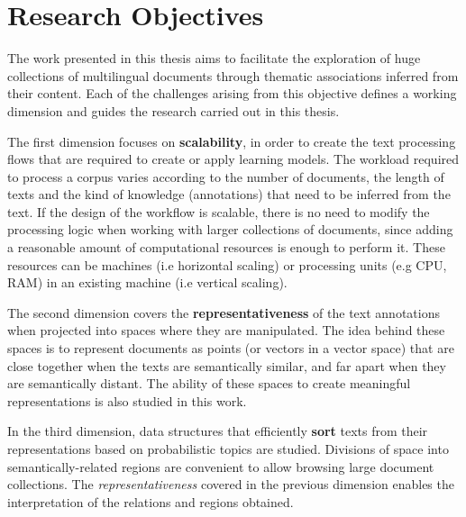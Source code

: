 

\chapter{Research Objectives}\label{ch:hypothesis}

\graphicspath{{hypothesis/figures/}}


The work presented in this thesis aims to facilitate the exploration of huge collections of multilingual documents through thematic associations inferred from their content. Each of the challenges arising from this objective defines a working dimension and guides the research carried out in this thesis.

The first dimension focuses on \textbf{scalability}, in order to create the text processing flows that are required to create or apply learning models. The workload required to process a corpus varies according to the number of documents, the length of texts and the kind of knowledge (annotations) that need to be inferred from the text. If the design of the workflow is scalable, there is no need to modify the processing logic when working with larger collections of documents, since adding a reasonable amount of computational resources is enough to perform it. These resources can be machines (i.e horizontal scaling) or processing units (e.g CPU, RAM) in an existing machine (i.e vertical scaling). 

The second dimension covers the \textbf{representativeness} of the text annotations when projected into spaces where they are manipulated. The idea behind these spaces is to represent documents as points (or vectors in a vector space) that are close together when the texts are semantically similar, and far apart when they are semantically distant. The ability of these spaces to create meaningful representations is also studied in this work.

In the third dimension, data structures that efficiently \textbf{sort} texts from their representations based on probabilistic topics are studied. Divisions of space into semantically-related regions are convenient to allow browsing large document collections. The \textit{representativeness} covered in the previous dimension enables the interpretation of the relations and regions obtained.

